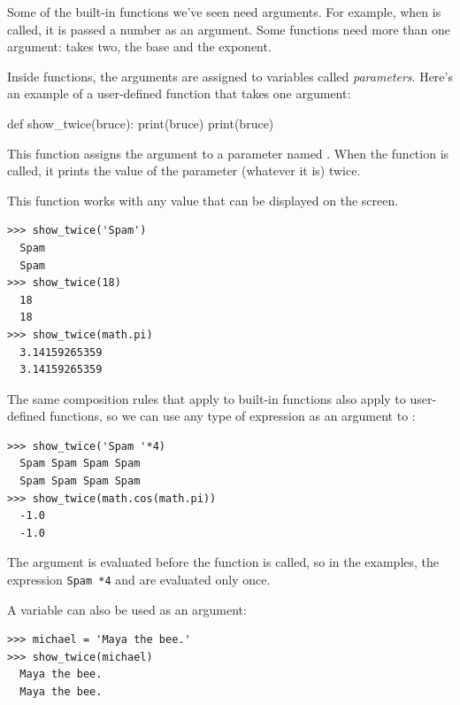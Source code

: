   

Some of the built-in functions we've seen need arguments. For example, when  is called, it is passed a number as an argument. Some functions need more than one argument:  takes two, the base and the exponent.

Inside functions, the arguments are assigned to variables called \emph{parameters}. Here's an example of a user-defined function that takes one argument:


\begin{python}[frame=single]
def show_twice(bruce):
    print(bruce)
    print(bruce)
\end{python}

This function assigns the argument to a parameter named . When the function is called, it prints the value of the parameter (whatever it is) twice.

This function works with any value that can be displayed on the screen.

\begin{Verbatim}[frame=single]
>>> show_twice('Spam')
  Spam
  Spam
>>> show_twice(18)
  18
  18
>>> show_twice(math.pi)
  3.14159265359
  3.14159265359
\end{Verbatim}

The same composition rules that apply to built-in functions also apply to user-defined functions, so we can use any type of expression as an argument to :


\begin{Verbatim}[frame=single]
>>> show_twice('Spam '*4)
  Spam Spam Spam Spam
  Spam Spam Spam Spam
>>> show_twice(math.cos(math.pi))
  -1.0
  -1.0
\end{Verbatim}

The argument is evaluated before the function is called, so in the examples, the expression \texttt{Spam\ *4} and  are evaluated only once.


A variable can also be used as an argument:

\begin{Verbatim}[frame=single]
>>> michael = 'Maya the bee.'
>>> show_twice(michael)
  Maya the bee.
  Maya the bee.
\end{Verbatim}

